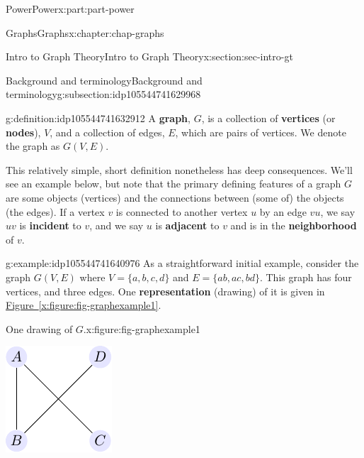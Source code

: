 \documentclass[oneside,10pt,]{book}
\newcommand{\xreffont}{\relax}
\newcommand{\terminology}[1]{\textbf{#1}}
\numberwithin{equation}{section}
\begin{document}
\begin{partptx}{Power}{}{Power}{}{}{x:part:part-power}
\begin{chapterptx}{Graphs}{}{Graphs}{}{}{x:chapter:chap-graphs}
\begin{sectionptx}{Intro to Graph Theory}{}{Intro to Graph Theory}{}{}{x:section:sec-intro-gt}
\begin{subsectionptx}{Background and terminology}{}{Background and terminology}{}{}{g:subsection:idp105544741629968}
\begin{definition}{}{g:definition:idp105544741632912}%
A \terminology{graph}, \(G\), is a collection of \terminology{vertices} (or \terminology{nodes}), \(V\), and a collection of edges, \(E\), which are pairs of vertices. We denote the graph as \(G(V,E)\).%
\end{definition}
This relatively simple, short definition nonetheless has deep consequences. We'll see an example below, but note that the primary defining features of a graph \(G\) are some objects (vertices) and the connections between (some of) the objects (the edges). If a vertex \(v\) is connected to another vertex \(u\) by an edge \(vu\), we say \(uv\) is \terminology{incident} to \(v\), and we say \(u\) is \terminology{adjacent} to \(v\) and is in the \terminology{neighborhood} of \(v\).%
\begin{example}{}{g:example:idp105544741640976}%
As a straightforward initial example, consider the graph \(G(V, E)\) where \(V = \{a,b,c,d\}\) and \(E = \{ab,ac,bd\}\). This graph has four vertices, and three edges. One \terminology{representation} (drawing) of it is given in \hyperref[x:figure:fig-graphexample1]{Figure~{\xreffont\ref{x:figure:fig-graphexample1}}}. \begin{figureptx}{One drawing of \(G\).}{x:figure:fig-graphexample1}{}%
\begin{image}{0.325}{0.35}{0.325}%
\includegraphics[width=\linewidth]{images/graph01.pdf}

\end{image}
\end{figureptx}
\end{example}
\end{subsectionptx}
\end{sectionptx}
\end{chapterptx}
\end{partptx}
\end{document}

